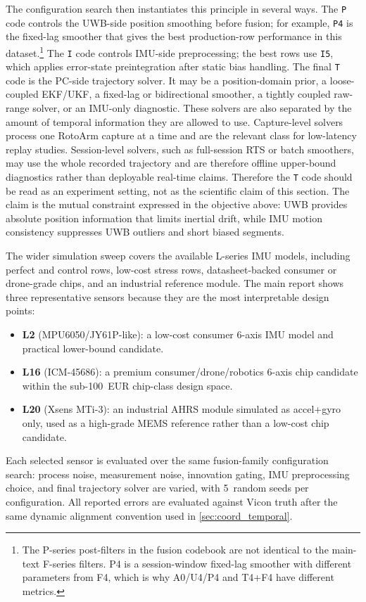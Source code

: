 \documentclass[11pt,a4paper]{article}
\begin{document}
The configuration search then instantiates this principle in several ways.
The \texttt{P} code controls the UWB-side position smoothing before fusion; for example, \texttt{P4} is the fixed-lag smoother that gives the best production-row performance in this dataset.\footnote{The P-series post-filters in the fusion codebook are not identical to the main-text F-series filters. P4 is a session-window fixed-lag smoother with different parameters from F4, which is why A0/U4/P4 and T4+F4 have different metrics.}
The \texttt{I} code controls IMU-side preprocessing; the best rows use \texttt{I5}, which applies error-state preintegration after static bias handling.
The final \texttt{T} code is the PC-side trajectory solver.
It may be a position-domain prior, a loose-coupled EKF/UKF, a fixed-lag or bidirectional smoother, a tightly coupled raw-range solver, or an IMU-only diagnostic.
These solvers are also separated by the amount of temporal information they are allowed to use.
Capture-level solvers process one RotoArm capture at a time and are the relevant class for low-latency replay studies.
Session-level solvers, such as full-session RTS or batch smoothers, may use the whole recorded trajectory and are therefore offline upper-bound diagnostics rather than deployable real-time claims.
Therefore the \texttt{T} code should be read as an experiment setting, not as the scientific claim of this section.
The claim is the mutual constraint expressed in the objective above: UWB provides absolute position information that limits inertial drift, while IMU motion consistency suppresses UWB outliers and short biased segments.

The wider simulation sweep covers the available L-series IMU models, including perfect and control rows, low-cost stress rows, datasheet-backed consumer or drone-grade chips, and an industrial reference module.
The main report shows three representative sensors because they are the most interpretable design points:
\begin{itemize}[nosep]
  \item \textbf{L2} (MPU6050/JY61P-like): a low-cost consumer 6-axis IMU model and practical lower-bound candidate.
  \item \textbf{L16} (ICM-45686): a premium consumer/drone/robotics 6-axis chip candidate within the sub-100~EUR chip-class design space.
  \item \textbf{L20} (Xsens MTi-3): an industrial AHRS module simulated as accel+gyro only, used as a high-grade MEMS reference rather than a low-cost chip candidate.
\end{itemize}
Each selected sensor is evaluated over the same fusion-family configuration search: process noise, measurement noise, innovation gating, IMU preprocessing choice, and final trajectory solver are varied, with 5~random seeds per configuration.
All reported errors are evaluated against Vicon truth after the same dynamic alignment convention used in \cref{sec:coord_temporal}.
\end{document}
